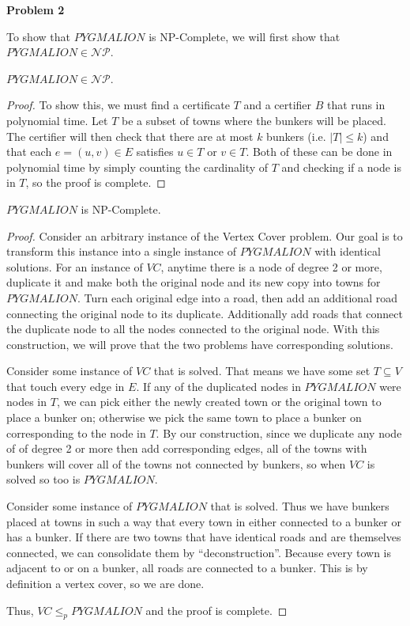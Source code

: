 \documentclass{article}
\newcommand{\Problem}[1]{\textbf{\large Problem #1}}
\begin{document}
\Problem{2}

To show that $PYGMALION$ is NP-Complete, we will first show that $PYGMALION \in \mathcal{NP}$. 
\begin{np}
$PYGMALION \in \mathcal{NP}$. 	
\end{np}
\begin{proof}
To show this, we must find a certificate $T$ and a certifier $B$ that runs in polynomial time.
Let $T$ be a subset of towns where the bunkers will be placed. 
The certifier will then check that there are at most $k$ bunkers (i.e. $|T| \leq k$) and that each $e = (u,v) \in E$ satisfies $u \in T$ or $v \in T$. 
Both of these can be done in polynomial time by simply counting the cardinality of $T$ and checking if a node is in $T$, so the proof is complete. 
\end{proof}
\begin{np}
$PYGMALION$ is NP-Complete. 	
\end{np}
\begin{proof}
Consider an arbitrary instance of the Vertex Cover problem.
Our goal is to transform this instance into a single instance of $PYGMALION$ with identical solutions.
For an instance of $VC$, anytime there is a node of degree 2 or more, duplicate it and make both the original node and its new copy into towns for $PYGMALION$. 
Turn each original edge into a road, then add an additional road connecting the original node to its duplicate. 
Additionally add roads that connect the duplicate node to all the nodes connected to the original node. 
With this construction, we will prove that the two problems have corresponding solutions.

Consider some instance of $VC$ that is solved. 
That means we have some set $T \subseteq V$ that touch every edge in $E$. 
If any of the duplicated nodes in $PYGMALION$ were nodes in $T$, we can pick either the newly created town or the original town to place a bunker on; otherwise we pick the same town to place a bunker on corresponding to the node in $T$. 
By our construction, since we duplicate any node of of degree 2 or more then add corresponding edges, all of the towns with bunkers will cover all of the towns not connected by bunkers, so when $VC$ is solved so too is $PYGMALION$.

Consider some instance of $PYGMALION$ that is solved.
Thus we have bunkers placed at towns in such a way that every town in either connected to a bunker or has a bunker. 
If there are two towns that have identical roads and are themselves connected, we can consolidate them by ``deconstruction''. 
Because every town is adjacent to or on a bunker, all roads are connected to a bunker.
This is by definition a vertex cover, so we are done.

Thus, $VC \leq_p PYGMALION$ and the proof is complete. 

\end{proof}
\end{document}

